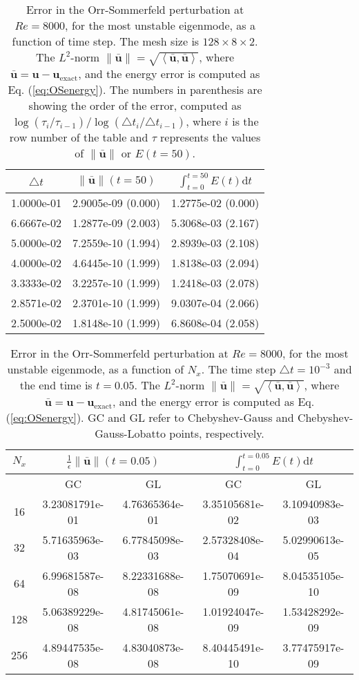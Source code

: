 \documentclass[preprint]{elsarticle}
\begin{document}
\begin{table}
	\centering
	\caption{Error in the Orr-Sommerfeld perturbation at $Re=8000$, for the most unstable eigenmode, as a function of time step. The mesh size is $128 \times 8 \times 2$. The $L^2$-norm $ \| \bar{\bm{u}} \| = \sqrt{\left< \bar{\bm{u}}, \bar{\bm{u}}\right>}$, where $\bar{\bm{u}}=\bm{u}-\bm{u}_{\mathrm{exact}}$, and the energy error is computed as Eq. (\ref{eq:OSenergy}). The numbers in parenthesis are showing the order of the error, computed as $\log(\tau_i/\tau_{i-1})/\log(\triangle t_i/ \triangle t_{i-1})$, where $i$ is the row number of the table and $\tau$ represents the values of $\|\bar{\bm{u}}\|$ or $E(t=50)$.  \label{tab:OS}}
	\begin{tabular}{ccc}	
 $\triangle t$ & $\| \bar{\bm{u}} \|(t=50)$ & $\int_{t=0}^{t=50}E(t) \mathrm{d}t$ \\
 \hline

1.0000e-01 & 2.9005e-09  (0.000) & 1.2775e-02 (0.000) \\
6.6667e-02 & 1.2877e-09  (2.003) & 5.3068e-03 (2.167) \\
5.0000e-02 & 7.2559e-10  (1.994) & 2.8939e-03 (2.108) \\
4.0000e-02 & 4.6445e-10  (1.999) & 1.8138e-03 (2.094) \\
3.3333e-02 & 3.2257e-10  (1.999) & 1.2418e-03 (2.078) \\
2.8571e-02 & 2.3701e-10  (1.999) & 9.0307e-04 (2.066) \\
2.5000e-02 & 1.8148e-10  (1.999) & 6.8608e-04 (2.058)
	\end{tabular}
\end{table}

\begin{table}
	\centering
	\caption{Error in the Orr-Sommerfeld perturbation at $Re=8000$, for the most unstable eigenmode, as a function of $N_x$. The time step $\triangle t = 10^{-3}$ and the end time is $t=0.05$. The $L^2$-norm $ \| \bar{\bm{u}} \| = \sqrt{\left< \bar{\bm{u}}, \bar{\bm{u}}\right>}$, where $\bar{\bm{u}}=\bm{u}-\bm{u}_{\mathrm{exact}}$, and the energy error is computed as Eq. (\ref{eq:OSenergy}). GC and GL refer to Chebyshev-Gauss and Chebyshev-Gauss-Lobatto points, respectively.   \label{tab:OS_spatial}}
	\begin{tabular}{ccccc}	
		$N_x$ & \multicolumn{2}{c}{$\frac{1}{\epsilon}{\| \bar{\bm{u}} \|(t=0.05)}$} & \multicolumn{2}{c}{$\int_{t=0}^{t=0.05}E(t) \mathrm{d}t$} \\
		\hline
			 & GC & GL & GC & GL \\
		\hline
16	&	3.23081791e-01	&	4.76365364e-01	&	3.35105681e-02	&	3.10940983e-03	\\
32	&	5.71635963e-03	&	6.77845098e-03	&	2.57328408e-04	&	5.02990613e-05	\\
64	&	6.99681587e-08	&	8.22331688e-08	&	1.75070691e-09	&	8.04535105e-10	\\
128	&	5.06389229e-08	&	4.81745061e-08	&	1.01924047e-09	&	1.53428292e-09	\\
256	&	4.89447535e-08	&	4.83040873e-08	&	8.40445491e-10	&	3.77475917e-09	
	\end{tabular}
\end{table}
\end{document}
